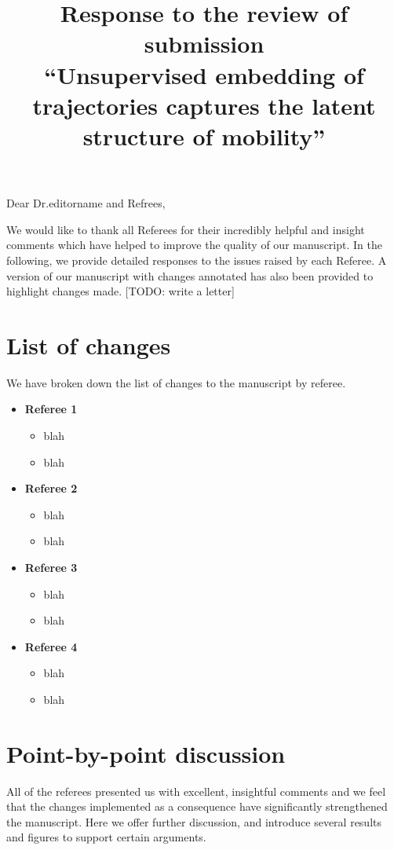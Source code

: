 \documentclass[12pt,a4paper]{article}
\title{Response to the review of submission\\  ``Unsupervised embedding of trajectories captures the latent structure of mobility''}
\date{}
\makeatletter
\newcommand{\todo}[1]{{\leavevmode\color{orange}[TODO: #1]}}
\renewcommand{\maketitle}{\bgroup\setlength{\parindent}{0pt}
\begin{flushleft}
\Large  \textbf{\@title}
\end{flushleft}\egroup
}
\makeatother
\begin{document}
\maketitle

\noindent Dear Dr.editorname and Refrees,


We would like to thank all Referees for their incredibly helpful and insight comments which have helped to improve the quality of our manuscript.
In the following, we provide detailed responses to the issues raised by each Referee.
A version of our manuscript with changes annotated has also been provided to highlight changes made.
\todo{write a letter}

\tableofcontents
\listoffigures

\section{List of changes}

We have broken down the list of changes to the manuscript by referee.

\begin{itemize} 
\item \textbf{Referee 1} 
     \begin{itemize} 
        \item blah
        \item blah
     \end{itemize}
\item \textbf{Referee 2} 
     \begin{itemize} 
        \item blah
        \item blah
     \end{itemize}
\item \textbf{Referee 3} 
     \begin{itemize} 
        \item blah
        \item blah
     \end{itemize}
 \item \textbf{Referee 4} 
     \begin{itemize} 
        \item blah
        \item blah
     \end{itemize}
\end{itemize}
\setlength{\parskip}{0.6em}


\section{Point-by-point discussion}
All of the referees presented us with excellent, insightful comments and we feel that the changes implemented as a consequence have signiﬁcantly strengthened the manuscript. Here we offer further discussion, and introduce several results and figures to support certain arguments.
\end{document}
